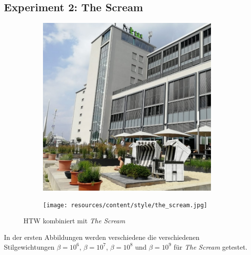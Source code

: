 \pagebreak

\subsection{Experiment 2: The Scream}

\begin{figure}[H]
    \centering
    \begin{subfigure}[h]{0.35\textwidth}
        \centering
        \includegraphics[width=\textwidth]{resources/content/content/htw-768x768.jpg}
    \end{subfigure}
    \begin{subfigure}[h]{0.35\textwidth}
        \centering
        \texttt{[image: resources/content/style/the\_scream.jpg]}
    \end{subfigure}
    \caption{HTW kombiniert mit \textit{The Scream} \cite{the_scream_img}}
\end{figure}

In der ersten Abbildungen werden verschiedene die verschiedenen  \\
Stilgewichtungen $ \beta = 10^{6} $, $ \beta = 10^{7} $, $ \beta = 10^{8} $ und $ \beta = 10^{9} $ für \textit{The Scream} getestet.

